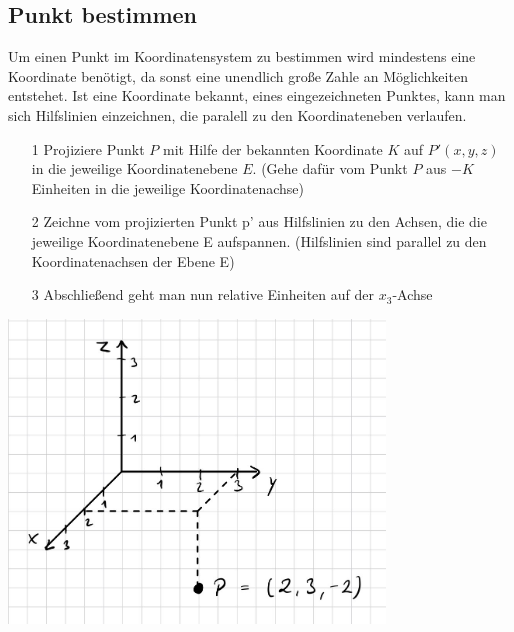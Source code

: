 \subsection{Punkt bestimmen}
Um einen Punkt im Koordinatensystem zu bestimmen wird mindestens eine Koordinate benötigt, da sonst eine unendlich große Zahle an Möglichkeiten entstehet. Ist eine Koordinate bekannt, eines eingezeichneten Punktes, kann man sich Hilfslinien einzeichnen, die paralell zu den Koordinateneben verlaufen. 
\begin{itemize}  
\item[1] Projiziere Punkt $P$ mit Hilfe der bekannten Koordinate $K$ auf $P'(x,y,z)$ in die jeweilige Koordinatenebene $E$. (Gehe dafür vom Punkt $P$ aus $-K$ Einheiten in die jeweilige Koordinatenachse)  
\item[2] Zeichne vom projizierten Punkt p' aus Hilfslinien zu den Achsen, die die jeweilige Koordinatenebene E aufspannen. (Hilfslinien sind parallel zu den Koordinatenachsen der Ebene E)   
\item[3] Abschließend geht man nun relative Einheiten auf der $x_3$-Achse   
\end{itemize} 
\includegraphics[width=10cm]{Media/punktablesen3dKoordinatensystem.jpg}
